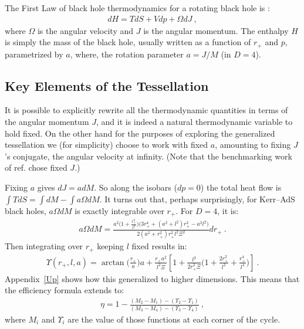 \documentclass[letterpaper,11pt]{article}
\newcommand{\bea}{\begin{eqnarray}}
\newcommand{\eea}{\end{eqnarray}}
\begin{document}
The First Law of black hole thermodynamics for a rotating black hole is \cite{Cvetic:2010jb}:
\bea \label{FirstLaw}
dH=TdS+Vdp+\Omega dJ \ ,
\eea
where $\Omega$ is the angular velocity and $J$ is the angular momentum. The enthalpy $H$ is simply the mass of the black hole, usually written as a function of $r_{+}$ and $p$, parametrized by $a$, where, the rotation parameter $a=J/M$ (in $D=4$). 


\subsection{Key Elements of the Tessellation}
\label{sec:details}
It is possible to explicitly rewrite all the thermodynamic quantities in terms of the angular momentum $J$, and  it  is indeed a natural thermodynamic variable to hold fixed. On the other hand for the purposes of exploring the generalized tessellation we (for simplicity) choose to work with  fixed $a$, amounting to  fixing $J$'s conjugate, the angular velocity at infinity. (Note that the benchmarking work of ref.\cite{Hennigar:2017apu} chose fixed $J$.) 

Fixing $a$   gives $dJ=adM$. So along the isobars ($dp=0$)  the total heat flow is  $\int TdS=\int dM - \int a\Omega dM$. It turns out that, perhaps surprisingly, for Kerr--AdS black holes,  $a\Omega dM$ is exactly integrable over $r_{+}$. For $D=4$, it is:
\bea \label{extraterm}
a\Omega dM=\frac{a^2\Big(1+\frac{r^2_{+}}{l^2}\Big)\Big(3r^4_{+}+(a^2+l^2)r^2_{+}-a^2 l^2\Big)}{2(a^2+r^2_{+})r^2_{+}l^2 \Xi ^2} dr_+\ .
\eea
Then integrating over $r_{+}$ keeping $l$ fixed results in:
\bea \label{newfn}
\Upsilon(r_{+},l,a)=\arctan \Big(\frac{r_{+}}{a}\Big) a +\frac{r_{+} a^2}{l^2 \Xi }\left[1+\frac{l^2}{2 r^2_{+} \Xi}\Big(1+\frac{2 r^2_{+}}{l^2}+\frac{r^4_{+}}{l^4}\Big)\right]\ .
\eea
 Appendix~\ref{Up} shows how this generalized to higher dimensions. This means that the efficiency formula  extends to:
\bea \label{ExtendedSimpleMass}
\eta=1-\frac{(M_{2}-M_{1})-(\Upsilon_{2}-\Upsilon_{1})}{(M_{3}-M_{4})-(\Upsilon_{3}-\Upsilon_{4})} \ ,
\eea
where $M_i$ and $\Upsilon_i$ are the value of those functions at each corner of the cycle. 
\end{document}
